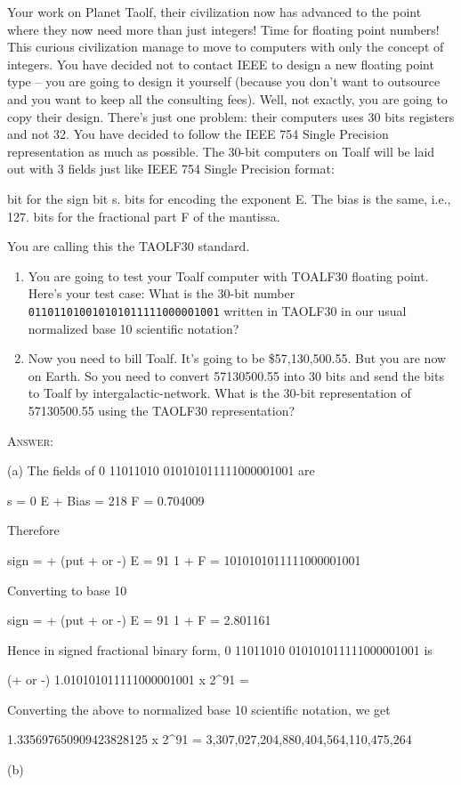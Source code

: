 \newpage
\nextq
Your work on Planet Taolf, their civilization now has advanced to the point
where they now need more than just integers!
Time for floating point numbers!
This curious civilization manage to move to computers with only the concept
of integers.
You have decided not to contact IEEE to design a new floating point type --
you are going to design it yourself (because you don’t want to outsource and
you want to keep all the consulting fees).
Well, not exactly, you are going to copy their design.
There’s just one problem:
their computers uses 30 bits registers and not 32.
You have decided to follow the IEEE 754 Single Precision representation as
much as possible.
The 30-bit computers on Toalf will be laid out with 3 fields just like IEEE 754
Single Precision format:
\begin{enumerate}[nosep]
 bit for the sign bit s.
 bits for encoding the exponent E. The bias is the same, i.e., 127.
 bits for the fractional part F of the mantissa.
\end{enumerate}
You are calling this the TAOLF30 standard.

\begin{enumerate}
\item[(a)] You are going to test your Toalf computer with TOALF30 floating
point.
Here’s your test case: What is the 30-bit number
\verb!011011010010101011111000001001! written in TAOLF30 in our usual
normalized base 10 scientific notation?
\item[(b)] Now you need to bill Toalf.
It’s going to be \$57,130,500.55.
But you are now on Earth.
So you need to convert 57130500.55 into 30 bits and send the bits to
Toalf by intergalactic-network. What is the 30-bit representation of
57130500.55 using the TAOLF30 representation?
\end{enumerate}

\textsc{Answer:}
\begin{answercode}
(a) The fields of 0 11011010 010101011111000001001 are

    s = 0
    E + Bias =  218
    F = 0.704009

Therefore

    sign = + (put + or -)
    E = 91
    1 + F = 1010101011111000001001

Converting to base 10

    sign = + (put + or -)
    E = 91
    1 + F = 2.801161

Hence in signed fractional binary form, 0 11011010 010101011111000001001 is

    (+ or -) 1.010101011111000001001 x 2^91 =  
    
Converting the above to normalized base 10 scientific notation, we get

1.335697650909423828125 x 2^91 = 3,307,027,204,880,404,564,110,475,264

(b)
\end{answercode}


